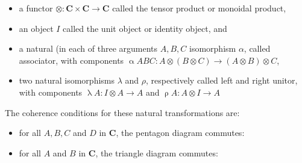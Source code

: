 \documentclass[a4paper]{article}
\begin{document}
\begin{itemize}
    \item a functor \(\otimes \colon \mathbf {C} \times \mathbf {C} \to \mathbf {C}\) called the tensor product or monoidal product,
    \item an object \( I \) called the unit object or identity object, and
    \item a natural (in each of three arguments \(A, B, C\) isomorphism \(\alpha\), called associator, with components
    \( \mathop{\alpha} A B C \colon A\otimes (B\otimes C) \to (A\otimes B)\otimes C\),
    \item two natural isomorphisms \(\lambda\)  and \(\rho\), respectively called left and right unitor, with components \( \mathop{\lambda} A \colon I\otimes A \to A\) and \(\mathop{\rho} A \colon A\otimes I \to A \)
\end{itemize}
The coherence conditions for these natural transformations are:
\begin{itemize}
    \item for all \(A, B, C\) and \(D\) in \(\mathbf {C}\), the pentagon diagram commutes:


    \item for all \(A\) and \(B\) in \(\mathbf{C}\), the triangle diagram commutes:

    
\end{itemize}
\end{document}

